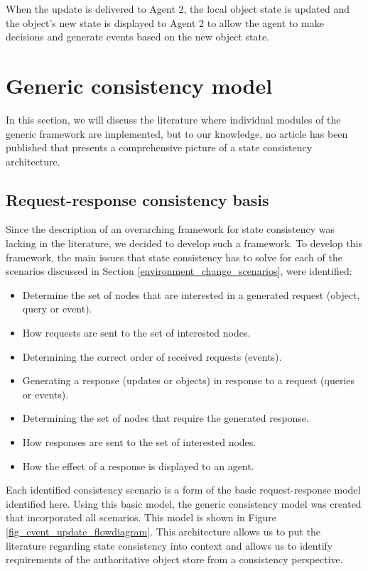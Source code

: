 When the update is delivered to Agent 2, the local object state is updated and the object's new state is displayed to Agent 2 to allow the agent to make decisions and generate events based on the new object state.

\section{Generic consistency model}
\label{generic_event_update_model}

In this section, we will discuss the literature where individual modules of the generic framework are implemented, but to our knowledge, no article has been published that presents a comprehensive picture of a state consistency architecture.

\subsection{Request-response consistency basis}
Since the description of an overarching framework for state consistency was lacking in the literature, we decided to develop such a framework. To develop this framework, the main issues that state consistency has to solve for each of the scenarios discussed in Section \ref{environment_change_scenarios}, were identified:
%
\begin{itemize}
\item Determine the set of nodes that are interested in a generated request (object, query or event).
\item How requests are sent to the set of interested nodes.
\item Determining the correct order of received requests (events).
\item Generating a response (updates or objects) in response to a request (queries or events).
\item Determining the set of nodes that require the generated response.
\item How responses are sent to the set of interested nodes.
\item How the effect of a response is displayed to an agent.
\end{itemize}

Each identified consistency scenario is a form of the basic request-response model identified here. Using this basic model, the generic consistency model was created that incorporated all scenarios. This model is shown in Figure \ref{fig_event_update_flowdiagram}. This architecture allows us to put the literature regarding state consistency into context and allows us to identify requirements of the authoritative object store from a consistency perspective.

